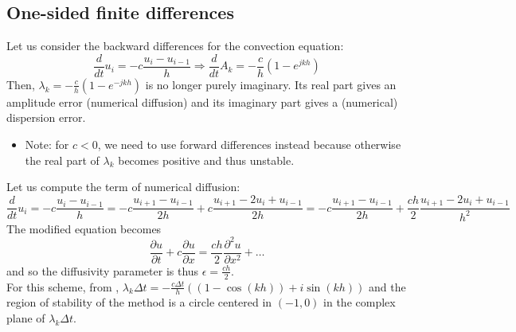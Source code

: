 \documentclass[12pt, openany]{report}
\theoremstyle{definition}
\begin{document}
\subsection{One-sided finite differences}
Let us consider the backward differences for the convection equation:
\begin{equation}\label{eq:upwind}
	\frac{d}{dt} u_i = - c \frac{u_i-u_{i-1}}{h}\Longrightarrow \frac{d}{dt} A_k = -\frac{c}{h} (1-e^{jkh})
\end{equation}
Then, $\lambda_k = -\frac{c}{h} (1-e^{-jkh})$ is no longer purely imaginary. Its real part gives an amplitude error (numerical diffusion) and its imaginary part gives a (numerical) dispersion error. 
\begin{itemize}
	\item [$\to$] Note: for $c<0$, we need to use forward differences instead because otherwise the real part of $\lambda_k$ becomes positive and thus unstable. 
\end{itemize}
Let us compute the term of numerical diffusion:
\begin{equation}
	\frac{d}{dt}u_i = -c\frac{u_i-u_{i-1}}{h} = -c \frac{u_{i+1}-u_{i-1}}{2h} + c \frac{u_{i+1}-2u_i+u_{i-1}}{2h} = -c \frac{u_{i+1}-u_{i-1}}{2h} + \frac{ch}{2}\frac{u_{i+1}-2u_i+u_{i-1}}{h^2}
\end{equation}
The modified equation becomes
\begin{equation}
	\frac{\partial u}{\partial t} + c\frac{\partial u}{\partial x} = \frac{ch}{2} \frac{\partial^2 u}{\partial x^2} + \dots 
\end{equation}
and so the diffusivity parameter is thus $\epsilon = \frac{ch}{2}$. \\
For this scheme, from , $\lambda_k \Delta t = -\frac{c\Delta t}{h} \left((1-\cos(kh)) + i\sin(kh)\right)$ and the region of stability of the method is a circle centered in $(-1,0)$ in the complex plane of $\lambda_k \Delta t$. 
\end{document}
